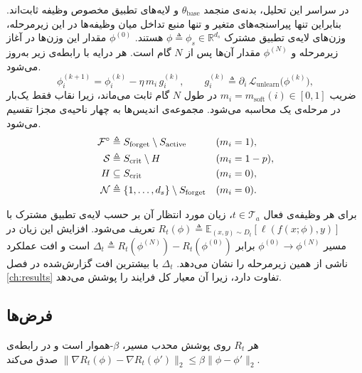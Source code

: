 در سراسر این تحلیل، بدنه‌ی منجمد $\theta_{\mathrm{base}}$ و لایه‌های تطبیق مخصوص وظیفه ثابت‌اند. بنابراین تنها پیراسنجه‌های متغیر و تنها منبع تداخل میان وظیفه‌ها در این زیرمرحله، وزن‌های لایه‌ی تطبیق مشترک $\phi\triangleq\phi_s\in\mathbb{R}^{d_s}$ هستند. $\phi^{(0)}$ مقدار این وزن‌ها در آغاز زیرمرحله و $\phi^{(N)}$ مقدار آن‌ها پس از $N$ گام است. هر درایه با رابطه‌ی زیر به‌روز می‌شود.
\begin{equation}
	\label{eq:coord-update}
	\phi^{(k+1)}_{i} = \phi^{(k)}_{i} - \eta\,m_{i}\,g^{(k)}_{i},
	\qquad
	g^{(k)}_{i} \triangleq \partial_{i}\,\mathcal{L}_{\mathrm{unlearn}}\big(\phi^{(k)}\big),
\end{equation}
ضریب $m_i=m_{\mathrm{soft}}(i)\in[0,1]$ در طول $N$ گام ثابت می‌ماند، زیرا نقاب فقط یک‌بار در مرحله‌ی یک محاسبه می‌شود. مجموعه‌ی اندیس‌ها به چهار ناحیه‌ی مجزا تقسیم می‌شود.
\begin{equation}
	\label{eq:partition}
	\begin{aligned}
		\mathcal{F}^{\circ} &\triangleq S_{\mathrm{forget}}\setminus S_{\mathrm{active}} && (m_i = 1),\\
		\mathcal{S} &\triangleq S_{\mathrm{crit}}\setminus H && (m_i = 1-p),\\
		H &\subseteq S_{\mathrm{crit}} && (m_i = 0),\\
		\mathcal{N} &\triangleq \{1,\dots,d_s\}\setminus S_{\mathrm{forget}} && (m_i = 0).
	\end{aligned}
\end{equation}

\begin{definition}
	\label{def:drop}
	برای هر وظیفه‌ی فعال $t\in\mathcal{T}_a$، زیان مورد انتظار آن بر حسب لایه‌ی تطبیق مشترک با $R_{t}(\phi)\triangleq\mathbb{E}_{(x,y)\sim D_t}[\ell(f(x;\phi),y)]$ تعریف می‌شود. افزایش این زیان در مسیر $\phi^{(0)}\!\to\!\phi^{(N)}$ برابر $\Delta_t\triangleq R_t(\phi^{(N)})-R_t(\phi^{(0)})$ است و افت عملکرد ناشی از همین زیرمرحله را نشان می‌دهد. $\Delta_t$ با بیشترین افت گزارش‌شده در فصل \ref{ch:results} تفاوت دارد، زیرا آن معیار کل فرایند را پوشش می‌دهد.
\end{definition}

\subsection{فرض‌ها}
\label{subsec:prop-theory-assumptions}

\begin{assumption}
	\label{asm:smooth}
	هر $R_t$ روی پوشش محدب مسیر، $\beta$-هموار است و در رابطه‌ی $\|\nabla R_t(\phi)-\nabla R_t(\phi')\|_2\leq\beta\|\phi-\phi'\|_2$ صدق می‌کند.
\end{assumption}

